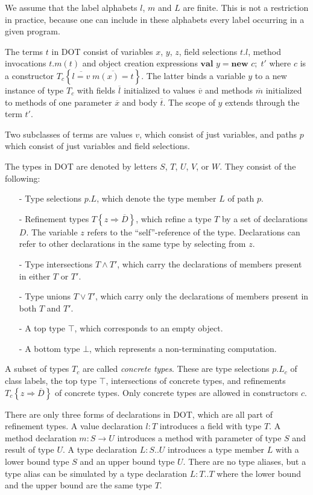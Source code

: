 \documentclass[9pt]{sigplanconf}
\newcommand{\tfun}{\rightarrow}
\newcommand{\tand}{\wedge}
\newcommand{\tor}{\vee}
\newcommand{\refine}[2]{\left\{#1 \Rightarrow #2 \right\}}
\newcommand{\ldefs}[1]{\left\{#1\right\}}
\newcommand{\seq}[1]{\overline{#1}}
\newcommand{\new}[3]{\textbf{val }#1 = \textbf{new }#2 ;\; #3}
\newcommand{\Ldecl}[3]{#1 : #2..#3}%
\newcommand{\ldecl}[2]{#1 : #2}
\newcommand{\mdecl}[3]{#1 : #2 \tfun #3}
\newcommand{\Top}{\top}%
\newcommand{\Bot}{\bot}%
\begin{document}
We assume that the label alphabets $l$, $m$ and $L$ are finite. This is
not a restriction in practice, because one can include in these 
alphabets every label occurring in a given program.

The terms $t$ in DOT consist of variables $x$, $y$, $z$, field
selections $t.l$, method invocations $t.m(t)$ and object creation
expressions $\new y c {t'}$ where $c$ is a constructor $T_c \ldefs{\seq{l
    = v}\;\seq{m(x) = t}}$. The latter binds a variable $y$ to a new
instance of type $T_c$ with fields $\seq l$ initialized to values
$\seq v$ and methods $\seq m$ initialized to methods of one parameter
$\seq{x}$ and body $\seq{t}$.  The scope of $y$ extends through the term
${t'}$.

Two subclasses of terms are values $v$, which consist of just
variables, and paths $p$ which consist of just variables and field
selections.

The types in DOT are denoted by letters $S$, $T$, $U$, $V$, or $W$. They consist of the following:
\begin{itemize}
\item[-] Type selections $p.L$, which denote the type member $L$ of path $p$.
\item[-] Refinement types $T \refine z {\seq D}$, which refine a type $T$ by a set of declarations $D$.
         The variable $z$ refers to the ``self''-reference of the type. Declarations can refer to
         other declarations in the same type by selecting from $z$.
\item[-] Type intersections $T \tand T'$, which carry the declarations of members present in either $T$ or $T'$.
\item[-] Type unions $T \tor T'$, which carry only the declarations of members present in both $T$ and $T'$.
\item[-] A top type $\Top$, which corresponds to an empty object.
\item[-] A bottom type $\Bot$, which represents a non-terminating computation.
\end{itemize}
A subset of types $T_c$ are called {\em concrete types}. These are type selections
$p.L_c$ of class labels,
the top type $\Top$, intersections of concrete types, and refinements $T_c \refine z {\seq D}$ of concrete types. Only concrete types are allowed in constructors $c$.

There are only three forms of declarations in DOT, which are all part
of refinement types.  A value declaration $\ldecl l T$ introduces a
field with type $T$.  A method declaration $\mdecl m S U$ introduces a
method with parameter of type $S$ and result of type $U$. A type
declaration $\Ldecl L S U$ introduces a type member $L$ with a lower
bound type $S$ and an upper bound type $U$. There are no type aliases,
but a type alias can be simulated by a type declaration $\Ldecl L T T$
where the lower bound and the upper bound are the same type $T$.
\end{document}
